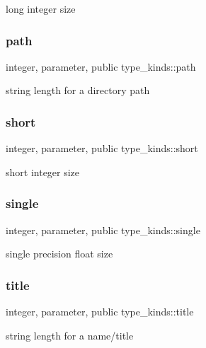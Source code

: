 long integer size 

\mbox{\label{namespacetype__kinds_a05ab6f6ff4279480c4fd6d8b04a3efbf}} 
\subsubsection{\texorpdfstring{path}{path}}
{\footnotesize\ttfamily integer, parameter, public type\+\_\+kinds\+::path}



string length for a directory path 

\mbox{\label{namespacetype__kinds_ab4d7bfce672e6152e78f87f8aa5b2e04}} 
\subsubsection{\texorpdfstring{short}{short}}
{\footnotesize\ttfamily integer, parameter, public type\+\_\+kinds\+::short}



short integer size 

\mbox{\label{namespacetype__kinds_a1752925d569776fd4a88872a620ed1d0}} 
\subsubsection{\texorpdfstring{single}{single}}
{\footnotesize\ttfamily integer, parameter, public type\+\_\+kinds\+::single}



single precision float size 

\mbox{\label{namespacetype__kinds_aa2f577aea616d9b9bb91ce438bdf3c02}} 
\subsubsection{\texorpdfstring{title}{title}}
{\footnotesize\ttfamily integer, parameter, public type\+\_\+kinds\+::title}



string length for a name/title 

